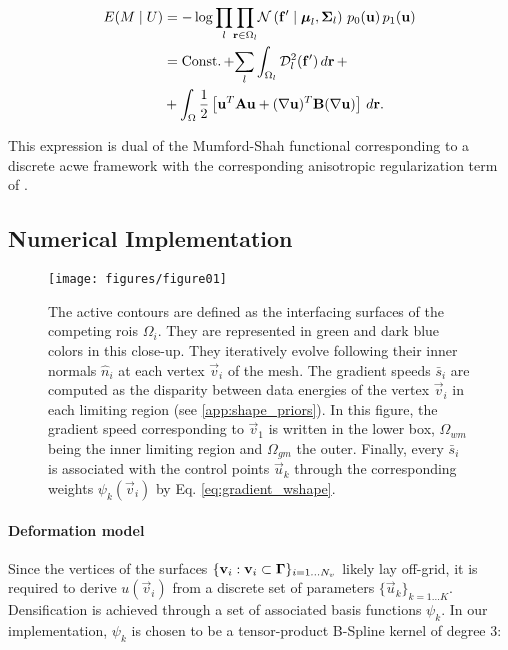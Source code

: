   \begin{align}
  E(M \mid U) &= -\log \underset{l}{\prod}
  \underset{\vec{r} \in \Omega_l}{\prod}
  \mathcal{N} \left( \vec{f}' \mid \boldsymbol{\mu}_l, \boldsymbol{\Sigma}_l \right)\,p_0( \vec{u})\,p_1( \vec{u}) \notag\\
  &= \const + \underset{l}{\sum} \int_{\Omega_l}
  \mdist{f'}{l} \,d\vec{r} \, + \notag\\
  &+ \int_{\Omega} \frac12 \left[ \vec{u}^T \mathbf{A} \vec{u} + (\nabla \vec{u})^T \mathbf{B} (\nabla \vec{u}) \right] \,d\vec{r}.
  \label{eq:energy}
  \end{align}
%

This expression is dual of the Mumford-Shah functional corresponding
  to a discrete \acrlong*{acwe} framework \citep{chan_active_2001}
  with the corresponding anisotropic regularization term of \cite{nagel_investigation_1986}.


\subsection{Numerical Implementation}
\label{sec:numerical_implementation}

\begin{figure}
	\texttt{[image: figures/figure01]}
	\caption{The active contours are defined as the interfacing surfaces of the competing
	  \glspl{roi} $\Omega_i$.
	They are represented in green and dark blue colors in this close-up.
	They iteratively evolve following their inner normals $\hat{n}_i$ at each vertex
	  $\vec{v}_i$ of the mesh.
	The gradient speeds $\bar{s}_i$ are computed as the disparity between data energies of
	  the vertex $\vec{v}_i$ in each limiting region (see \ref{app:shape_priors}).
	In this figure, the gradient speed corresponding to $\vec{v}_1$ is written in the lower
	  box, $\Omega_{wm}$ being the inner limiting region and $\Omega_{gm}$ the outer.
	Finally, every $\bar{s}_i$ is associated with the control points $\vec{u}_k$ through
	  the corresponding weights $\psi_k(\vec{v}_i)$ by Eq. \eqref{eq:gradient_wshape}.
	}\label{fig:method}
\end{figure}

\paragraph*{Deformation model}\label{sec:deformation_model}
Since the vertices of the surfaces $\{\mathbf{v}_i: \mathbf{v}_i \subset \boldsymbol{\Gamma} \}_{i=1 \ldots N_v}$
  likely lay off-grid, it is required to derive $u(\vec{v}_i)$ from a discrete set of parameters
  $\{\vec{u}_k\}_{k=1 \ldots K}$.
Densification is achieved through a set of associated basis functions $\psi_k$.
In our implementation, $\psi_k$ is chosen to be a tensor-product B-Spline kernel
  of degree 3: %

